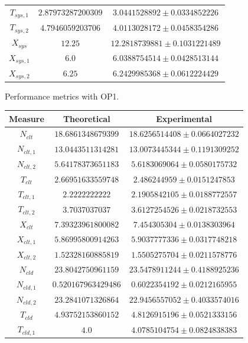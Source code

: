 \begin{figure}
\begin{center}
\begin{tabular}{|c||c|c|}
$T_{sys,1}$  & $2.87973287200309$ & $3.0441528892\pm 0.0334852226$ \\ 
$T_{sys,2}$  & $4.7946059203706$ & $4.0113028172\pm 0.0458354286$ \\ 
$X_{sys}$  & $12.25$ & $12.2818739881\pm 0.1031221489$ \\ 
$X_{sys,1}$  & $6.0$ & $6.0388754514\pm 0.0428513144$ \\ 
$X_{sys,2}$  & $6.25$ & $6.2429985368\pm 0.0612224429$ \\ 
\hline 
		\end{tabular}
	\end{center}
	\caption{Performance metrics with OP1.}
	\label{tbl:evaluation-performance-metrics-1}
\end{figure}

\begin{figure}
	\begin{center}
		\begin{tabular}{|c||c|c|}
\hline
Measure & Theoretical & Experimental \\
\hline
$N_{clt}$  & $18.6861348679399$ & $18.6256514408\pm 0.0664027232$ \\ 
$N_{clt,1}$  & $13.0443511314281$ & $13.0073445344\pm 0.1191309252$ \\ 
$N_{clt,2}$  & $5.64178373651183$ & $5.6183069064\pm 0.0580175732$ \\ 
$T_{clt}$  & $2.66951633559748$ & $2.486244959\pm 0.0151247853$ \\ 
$T_{clt,1}$  & $2.2222222222$ & $2.1905842105\pm 0.0188772557$ \\ 
$T_{clt,2}$  & $3.7037037037$ & $3.6127254526\pm 0.0218732553$ \\ 
$X_{clt}$  & $7.39323961800082$ & $7.454305304\pm 0.0138303964$ \\ 
$X_{clt,1}$  & $5.86995800914263$ & $5.9037777336\pm 0.0317748218$ \\ 
$X_{clt,2}$  & $1.52328160885819$ & $1.5505275704\pm 0.0211578776$ \\ 
\hline 
$N_{cld}$  & $23.8042750961159$ & $23.5478911244\pm 0.4188925236$ \\ 
$N_{cld,1}$  & $0.520167963429486$ & $0.6022354192\pm 0.0212165955$ \\ 
$N_{cld,2}$  & $23.2841071326864$ & $22.9456557052\pm 0.4033574016$ \\ 
$T_{cld}$  & $4.93752153860152$ & $4.8126915196\pm 0.0521333156$ \\ 
$T_{cld,1}$  & $4.0$ & $4.0785104754\pm 0.0824838383$ \\ 

\end{tabular}
\end{center}
\end{figure}
